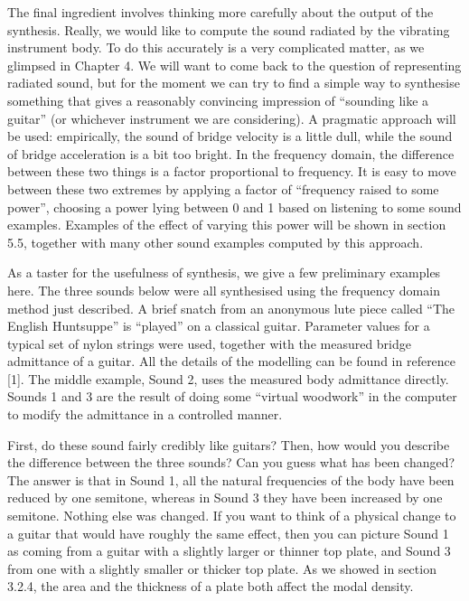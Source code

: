   The final ingredient involves thinking more carefully about the output of the 
  synthesis. Really, we would like to compute the sound radiated by the 
  vibrating instrument body. To do this accurately is a very complicated 
  matter, as we glimpsed in Chapter 4. We will want to come back to the 
  question of representing radiated sound, but for the moment we can try to 
  find a simple way to synthesise something that gives a reasonably convincing 
  impression of ``sounding like a guitar'' (or whichever instrument we are 
  considering). A pragmatic approach will be used: empirically, the sound of 
  bridge velocity is a little dull, while the sound of bridge acceleration is a 
  bit too bright. In the frequency domain, the difference between these two 
  things is a factor proportional to frequency. It is easy to move between 
  these two extremes by applying a factor of ``frequency raised to some 
  power'', choosing a power lying between 0 and 1 based on listening to some 
  sound examples. Examples of the effect of varying this power will be shown in 
  section 5.5, together with many other sound examples computed by this 
  approach. 

  As a taster for the usefulness of synthesis, we give a few preliminary 
  examples here. The three sounds below were all synthesised using the 
  frequency domain method just described. A brief snatch from an anonymous lute 
  piece called ``The English Huntsuppe'' is ``played'' on a classical guitar. 
  Parameter values for a typical set of nylon strings were used, together with 
  the measured bridge admittance of a guitar. All the details of the modelling 
  can be found in reference [1]. The middle example, Sound 2, uses the measured 
  body admittance directly. Sounds 1 and 3 are the result of doing some 
  ``virtual woodwork'' in the computer to modify the admittance in a controlled 
  manner. 

  First, do these sound fairly credibly like guitars? Then, how would you 
  describe the difference between the three sounds? Can you guess what has been 
  changed? The answer is that in Sound 1, all the natural frequencies of the 
  body have been reduced by one semitone, whereas in Sound 3 they have been 
  increased by one semitone. Nothing else was changed. If you want to think of 
  a physical change to a guitar that would have roughly the same effect, then 
  you can picture Sound 1 as coming from a guitar with a slightly larger or 
  thinner top plate, and Sound 3 from one with a slightly smaller or thicker 
  top plate. As we showed in section 3.2.4, the area and the thickness of a 
  plate both affect the modal density. 

